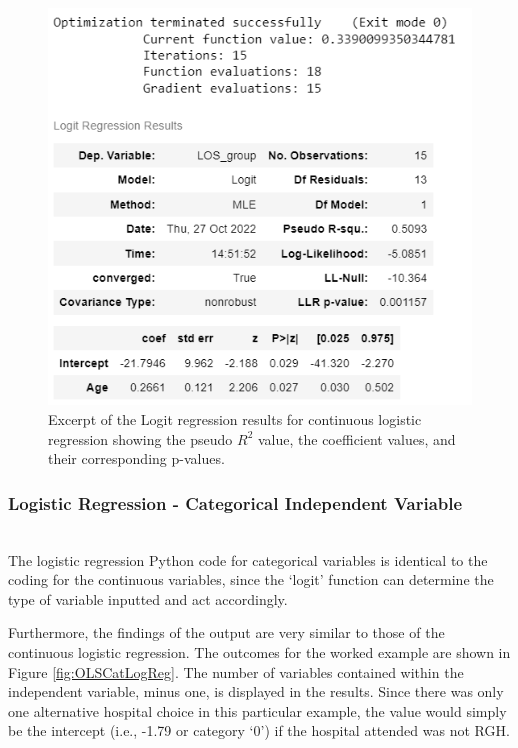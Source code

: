 \documentclass[../thesis.tex]{subfiles}
\begin{document}
\begin{figure}[h!]
    \centering
    \includegraphics{Chapters/Chapter3/Figures/Logit_cont_results.png}
    \caption{Excerpt of the Logit regression results for continuous logistic regression showing the pseudo \(R^2\) value, the coefficient values, and their corresponding p-values.}
    \label{fig:OLSConLogReg}
\end{figure}




\subsubsection{Logistic Regression - Categorical Independent Variable}\\
The logistic regression Python code for categorical variables is identical to the coding for the continuous variables, since the `logit' function can determine the type of variable inputted and act accordingly.

Furthermore, the findings of the output are very similar to those of the continuous logistic regression. The outcomes for the worked example are shown in Figure \ref{fig:OLSCatLogReg}. The number of variables contained within the independent variable, minus one, is displayed in the results. Since there was only one alternative hospital choice in this particular example, the value would simply be the intercept (i.e., -1.79 or category `0') if the hospital attended was not RGH.
\end{document}
